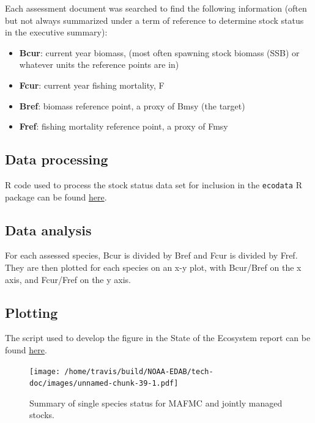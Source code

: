\documentclass[
]{book}
\begin{document}
Each assessment document was searched to find the following information (often but not always summarized under a term of reference to determine stock status in the executive summary):

\begin{itemize}
\item
  \textbf{Bcur}: current year biomass, (most often spawning stock biomass (SSB) or whatever units the reference points are in)
\item
  \textbf{Fcur}: current year fishing mortality, F
\item
  \textbf{Bref}: biomass reference point, a proxy of Bmsy (the target)
\item
  \textbf{Fref}: fishing mortality reference point, a proxy of Fmsy
\end{itemize}

\hypertarget{data-processing-25}{%
\subsection{Data processing}\label{data-processing-25}}

R code used to process the stock status data set for inclusion in the \texttt{ecodata} R package can be found \href{https://github.com/NOAA-EDAB/ecodata/blob/master/data-raw/get_stocks.R}{here}.

\hypertarget{data-analysis-34}{%
\subsection{Data analysis}\label{data-analysis-34}}

For each assessed species, Bcur is divided by Bref and Fcur is divided by Fref. They are then plotted for each species on an x-y plot, with Bcur/Bref on the x axis, and Fcur/Fref on the y axis.

\hypertarget{plotting-28}{%
\subsection{Plotting}\label{plotting-28}}

The script used to develop the figure in the State of the Ecosystem report can be found \href{https://github.com/NOAA-EDAB/ecodata/blob/master/chunk-scripts/human_dimensions.Rmd-stock-status1.R}{here}.

\begin{figure}
\centering
\texttt{[image: /home/travis/build/NOAA-EDAB/tech-doc/images/unnamed-chunk-39-1.pdf]}
\caption{\label{fig:unnamed-chunk-39}Summary of single species status for MAFMC and jointly managed stocks.}
\end{figure}
\end{document}
